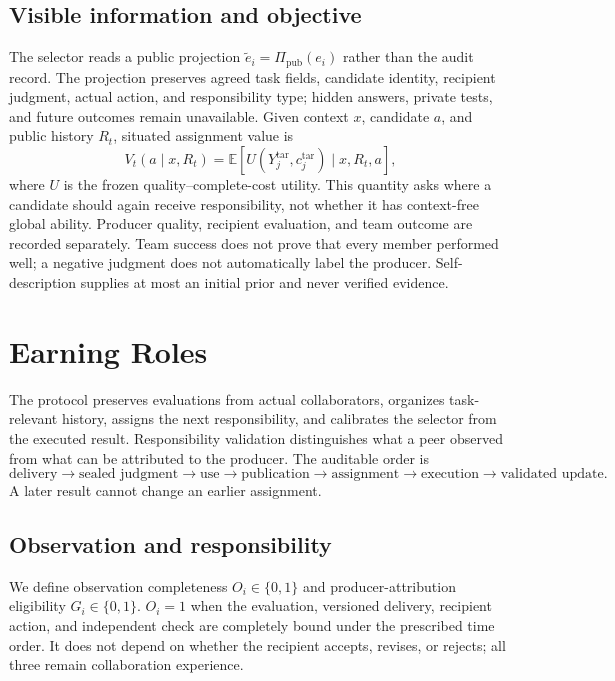 \documentclass[sigconf,anonymous]{aamas}
\begin{document}
\subsection{Visible information and objective}
The selector reads a public projection $\tilde e_i=\Pi_{\mathrm{pub}}(e_i)$ rather than the audit record. The projection preserves agreed task fields, candidate identity, recipient judgment, actual action, and responsibility type; hidden answers, private tests, and future outcomes remain unavailable. Given context $x$, candidate $a$, and public history $R_t$, situated assignment value is
\begin{equation}
 V_t(a\mid x,R_t)=\mathbb{E}[U(Y_j^{\mathrm{tar}},c_j^{\mathrm{tar}})\mid x,R_t,a],
\label{eq:value}
\end{equation}
where $U$ is the frozen quality--complete-cost utility. This quantity asks where a candidate should again receive responsibility, not whether it has context-free global ability. Producer quality, recipient evaluation, and team outcome are recorded separately. Team success does not prove that every member performed well; a negative judgment does not automatically label the producer. Self-description supplies at most an initial prior and never verified evidence.

\section{Earning Roles}
\label{sec:method}
The protocol preserves evaluations from actual collaborators, organizes task-relevant history, assigns the next responsibility, and calibrates the selector from the executed result. Responsibility validation distinguishes what a peer observed from what can be attributed to the producer. The auditable order is
\begin{equation}
\text{delivery}\rightarrow\text{sealed judgment}\rightarrow\text{use}\rightarrow\text{publication}
\rightarrow\text{assignment}\rightarrow\text{execution}\rightarrow\text{validated update}.
\label{eq:order}
\end{equation}
A later result cannot change an earlier assignment.

\subsection{Observation and responsibility}
We define observation completeness $O_i\in\{0,1\}$ and producer-attribution eligibility $G_i\in\{0,1\}$. $O_i=1$ when the evaluation, versioned delivery, recipient action, and independent check are completely bound under the prescribed time order. It does not depend on whether the recipient accepts, revises, or rejects; all three remain collaboration experience.
\end{document}
